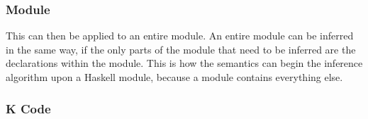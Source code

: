 \subsubsection{Module}

This can then be applied to an entire module. An entire module can be inferred in the same way, if the only parts of the module that need to be inferred are the declarations within the module. This is how the semantics can begin the inference algorithm upon a Haskell module, because a module contains everything else.

\begin{prooftree}
\end{prooftree}

\subsubsection{K Code}


